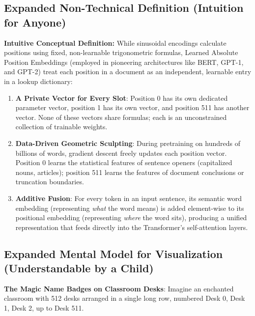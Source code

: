 \documentclass[11pt,a4paper]{article}
\theoremstyle{definition}
\begin{document}
\subsection{Expanded Non-Technical Definition (Intuition for Anyone)}
\textbf{Intuitive Conceptual Definition:}
While sinusoidal encodings calculate positions using fixed, non-learnable trigonometric formulas, Learned Absolute Position Embeddings (employed in pioneering architectures like BERT, GPT-1, and GPT-2) treat each position in a document as an independent, learnable entry in a lookup dictionary:
\begin{enumerate}
    \item \textbf{A Private Vector for Every Slot}: Position 0 has its own dedicated parameter vector, position 1 has its own vector, and position 511 has another vector. None of these vectors share formulas; each is an unconstrained collection of trainable weights.
    \item \textbf{Data-Driven Geometric Sculpting}: During pretraining on hundreds of billions of words, gradient descent freely updates each position vector. Position 0 learns the statistical features of sentence openers (capitalized nouns, articles); position 511 learns the features of document conclusions or truncation boundaries.
    \item \textbf{Additive Fusion}: For every token in an input sentence, its semantic word embedding (representing \emph{what} the word means) is added element-wise to its positional embedding (representing \emph{where} the word sits), producing a unified representation that feeds directly into the Transformer's self-attention layers.
\end{enumerate}

\subsection{Expanded Mental Model for Visualization (Understandable by a Child)}
\textbf{The Magic Name Badges on Classroom Desks}:
Imagine an enchanted classroom with 512 desks arranged in a single long row, numbered Desk 0, Desk 1, Desk 2, up to Desk 511.
\end{document}
